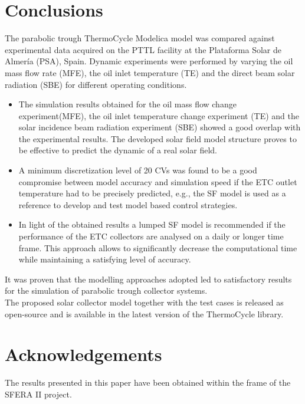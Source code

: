 \documentclass[final,3p,times,review]{elsarticle}
\begin{document}
%


%
\section{Conclusions}
%
The parabolic trough ThermoCycle Modelica model was compared against experimental data acquired on the PTTL facility at the Plataforma Solar de Almer\' ia (PSA), Spain. Dynamic experiments were performed by varying the oil mass flow rate (MFE), the oil inlet temperature (TE) and the direct beam solar radiation (SBE) for different operating conditions. 
%
\begin{itemize}
\item The simulation results obtained for the oil mass flow change experiment(MFE), the oil inlet temperature change experiment (TE) and the solar incidence beam radiation experiment (SBE) showed a good overlap with the experimental results. The developed solar field model structure proves to be effective to predict the dynamic of a real solar field.
%
%
\item A minimum discretization level of 20 CVs was found to be a good compromise between model accuracy and simulation speed if the ETC outlet temperature had to be precisely predicted, e.g., the  SF model is used as a reference to develop and test model based control strategies.
%
\item In light of the obtained results a lumped SF model is recommended if the performance of the ETC collectors are analysed on a daily or longer time frame. This approach allows to significantly decrease the computational time while maintaining a satisfying level of accuracy.
\end{itemize}
%
It was proven that the modelling approaches adopted led to satisfactory results for the simulation of parabolic trough collector systems.\\
The proposed solar collector model together with the test cases is released as open-source and is available in the latest version of the ThermoCycle library.\\
%
%
%
\section{Acknowledgements}
%
The results presented in this paper have been obtained within the frame of the SFERA II project.
%
\clearpage


\end{document}
